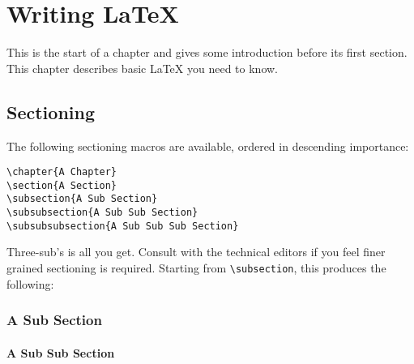 
\chapter{Writing \LaTeX}

This is the start of a chapter and gives some introduction before its first section.  This chapter describes basic \LaTeX{} you need to know.

\section{Sectioning}
\label{sec:sectioning}

The following sectioning macros are available, ordered in descending
importance:

\begin{verbatim}
\chapter{A Chapter}
\section{A Section}
\subsection{A Sub Section}
\subsubsection{A Sub Sub Section}
\subsubsubsection{A Sub Sub Sub Section}
\end{verbatim}

Three-sub's is all you get.  
Consult with the technical editors if you feel finer grained
sectioning is required.
Starting from \verb|\subsection|, this produces the following:

\subsection{A Sub Section}
\subsubsection{A Sub Sub Section}

